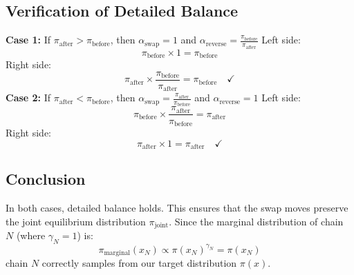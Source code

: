 \documentclass[12pt]{article}
\begin{document}
\subsection{Verification of Detailed Balance}
\textbf{Case 1:} If $\pi_{\text{after}} > \pi_{\text{before}}$, then $\alpha_{\text{swap}} = 1$ and $\alpha_{\text{reverse}} = \frac{\pi_{\text{before}}}{\pi_{\text{after}}}$
Left side:
\begin{equation}
\pi_{\text{before}} \times 1 = \pi_{\text{before}}
\end{equation}
Right side:
\begin{equation}
\pi_{\text{after}} \times \frac{\pi_{\text{before}}}{\pi_{\text{after}}} = \pi_{\text{before}} \quad \checkmark
\end{equation}
\textbf{Case 2:} If $\pi_{\text{after}} < \pi_{\text{before}}$, then $\alpha_{\text{swap}} = \frac{\pi_{\text{after}}}{\pi_{\text{before}}}$ and $\alpha_{\text{reverse}} = 1$
Left side:
\begin{equation}
\pi_{\text{before}} \times \frac{\pi_{\text{after}}}{\pi_{\text{before}}} = \pi_{\text{after}}
\end{equation}
Right side:
\begin{equation}
\pi_{\text{after}} \times 1 = \pi_{\text{after}} \quad \checkmark
\end{equation}
\subsection{Conclusion}
In both cases, detailed balance holds. This ensures that the swap moves preserve the joint equilibrium distribution $\pi_{\text{joint}}$. Since the marginal distribution of chain $N$ (where $\gamma_N = 1$) is:
\begin{equation}
\pi_{\text{marginal}}(x_N) \propto \pi(x_N)^{\gamma_N} = \pi(x_N)
\end{equation}
chain $N$ correctly samples from our target distribution $\pi(x)$.
\end{document}
